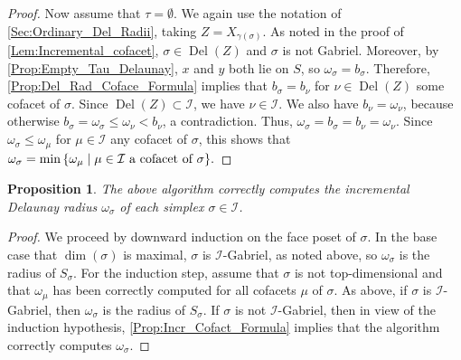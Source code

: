 \documentclass[11pt]{amsart}
\DeclareMathOperator{\DelT}{Del}
\newcommand{\Incr}[0]{\mathcal{I}}
\theoremstyle{plain}
\newtheorem{proposition}[theorem]{Proposition}
\theoremstyle{definition}
\theoremstyle{remark}
\begin{document}
\begin{proof}
%
Now assume that $\tau=\emptyset$.  We again use the notation of \cref{Sec:Ordinary_Del_Radii}, taking $Z=X_{\gamma(\sigma)}$.  
As noted in the proof of \cref{Lem:Incremental_cofacet}, $\sigma\in \DelT(Z)$ and $\sigma$ is not Gabriel.
Moreover, by \cref{Prop:Empty_Tau_Delaunay}, $x$ and $y$ both lie on $S$, so $\omega_{\sigma}=b_{\sigma}$.   Therefore, \cref{Prop:Del_Rad_Coface_Formula} implies that $b_{\sigma}=b_{\nu}$ for $\nu\in \DelT(Z)$ some cofacet of $\sigma$.  Since  $\DelT(Z)\subset \Incr$, we have $\nu\in \Incr$.  We also have $b_\nu=\omega_\nu$, because otherwise $b_\sigma=\omega_\sigma \leq \omega_\nu < b_\nu$, a contradiction.  Thus, $\omega_\sigma=b_\sigma=b_\nu=\omega_\nu$.  Since $\omega_{\sigma}\leq \omega_\mu$ for  $\mu\in \Incr$ any cofacet of $\sigma$, this shows that $\omega_{\sigma}= \min\, \{\omega_{\mu} \mid \mu\in \Incr \textup{ a cofacet of } \sigma\}.$
\end{proof}
%
\begin{proposition} 
    The above algorithm correctly computes the incremental Delaunay radius $\omega_\sigma$ of each simplex $\sigma \in \Incr$.
\end{proposition}
%
\begin{proof}
We proceed by downward induction on the face poset of $\sigma$.  In the base case that $\dim(\sigma)$ is maximal, $\sigma$ is $\Incr$-Gabriel, as noted above, so  $\omega_{\sigma}$ is the radius of $ S_{\sigma}$.  
For the induction step, assume that $\sigma$ is not top-dimensional and that $\omega_{\mu}$ has been correctly computed for all cofacets $\mu$ of $\sigma$.  As above, if $\sigma$ is $\Incr$-Gabriel, then $\omega_{\sigma}$ is the radius of $S_\sigma$.  If $\sigma$ is not $\Incr$-Gabriel, then in view of the induction hypothesis, \cref{Prop:Incr_Cofact_Formula} implies that the algorithm correctly computes $\omega_{\sigma}$. 
\end{proof}
%
%
\newpage



\end{document}
